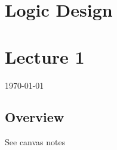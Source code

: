 \documentclass[12pt]{article}
\begin{document}
{\centering
\section*{Logic Design}
\section*{Lecture 1}
\indent\today
}

\subsection*{Overview}
See canvas notes
\end{document}
